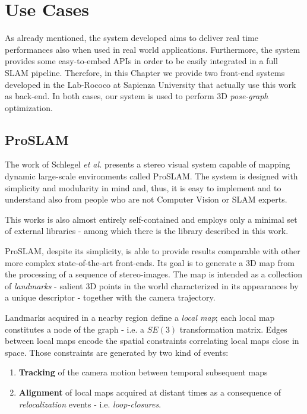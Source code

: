 \chapter{Use Cases}\label{ch:cases}
As already mentioned, the system developed aims to deliver real time performances also when used in real world applications. Furthermore, the system provides some easy-to-embed APIs in order to be easily integrated in a full SLAM pipeline. Therefore, in this Chapter we provide two front-end systems developed in the Lab-Rococo at Sapienza University that actually use this work as back-end. In both cases, our system is used to perform 3D \textit{pose-graph} optimization.

\section{ProSLAM}\label{sec:proslam}
The work of Schlegel \textit{et al.} \cite{schlegel2017proslam} presents a stereo visual system capable of mapping dynamic large-scale environments called ProSLAM. The system is designed with simplicity and modularity in mind and, thus, it is easy to implement and to understand also from people who are not Computer Vision or SLAM experts.

This works is also almost entirely self-contained and employs only a minimal set of external libraries - among which there is the library described in this work.

ProSLAM, despite its simplicity, is able to provide results comparable with other more complex state-of-the-art front-ends. Its goal is to generate a 3D map from the processing of a sequence of stereo-images. The map is intended as a collection of \textit{landmarks} - salient 3D points in the world characterized in its appearances by a unique descriptor - together with the camera trajectory. 

Landmarks acquired in a nearby region define a \textit{local map}; each local map constitutes a node of the graph - i.e. a $SE(3)$ transformation matrix. Edges between local maps encode the spatial constraints correlating local maps close in space. Those constraints are generated by two kind of events:

\begin{enumerate}
    \item \textbf{Tracking} of the camera motion between temporal subsequent maps
    \item \textbf{Alignment} of local maps acquired at distant times as a consequence of \textit{relocalization} events - i.e. \textit{loop-closures}.
\end{enumerate}

